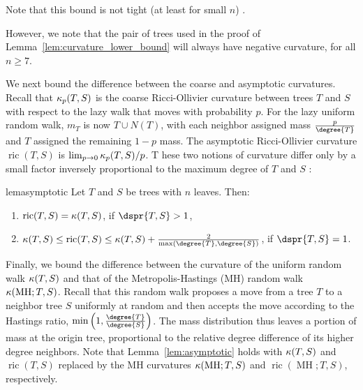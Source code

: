 \documentclass[10pt,twoside,leqno,twocolumn]{article}
\newcommand{\MH}{\operatorname{MH}}
\newcommand{\cuttable}[2][]{%
    \ifthenelse{\equal{#1}{}}%
		{}%
		{#1}%
}
\newcommand{\curvature}[2][]{%
    \ifthenelse{\equal{#1}{}}%
		{\kappa(#2)}%
		{\kappa_{#1}(#2)}%
}
\newcommand{\ric}[1]{
	\operatorname{ric}(#1)%
}
\begin{document}
Note that this bound is not tight (at least for small $n$)\cuttable{ as it is rarely necessary to transport mass the maximum distance between unpaired trees}.
\cuttable{We also note that the lower bounds in this section do not follow from the more general setting described in \cite{Jost2013-ce}.}
However, we note that the pair of trees used in the proof of Lemma~\ref{lem:curvature_lower_bound} will always have negative curvature, for all $n \ge 7$.

We next bound the difference between the coarse and asymptotic curvatures.
Recall that $\curvature[p]{T,S}$ is the coarse Ricci-Ollivier curvature between trees $T$ and $S$ with respect to the lazy walk that \cuttable{remains at a given tree with probability $1-p$ and }moves with probability $p$.
For the lazy uniform random walk, $m_T$ is now $T \cup N(T)$, with each neighbor assigned mass $\frac{p}{\degree{T}}$ and $T$ assigned the remaining $1 - p$ mass.
The asymptotic Ricci-Ollivier curvature $\ric{T,S}$ is $\lim_{p \rightarrow 0} \curvature[p]{T,S} / p$.
\cuttable[T]{As we now prove, t}hese two notions of curvature differ only by a small factor inversely proportional to the maximum degree of $T$ and $S$\cuttable[:]{.}

\begin{restatable}{lem}{asymptotic}
\label{lem:asymptotic}
	Let $T$ and $S$ be trees with $n$ leaves.
	Then:
	\begin{enumerate}
		\item	$\ric{T,S} = \curvature{T,S}$, if $\dspr{T,S} > 1$,
		\item	$\curvature{T,S} \le \ric{T,S} \le \curvature{T,S} + \frac{2}{\max(\degree{T}, \degree{S})}$, if $\dspr{T,S} = 1$.
	\end{enumerate}
\end{restatable}


Finally, we bound the difference between the curvature of the uniform random walk $\curvature{T,S}$ and that of the Metropolis-Hastings (MH) random walk $\curvature{\MH; T,S}$.
Recall that this random walk proposes a move from a tree $T$ to a neighbor tree $S$ uniformly at random and then accepts the move according to the Hastings ratio, \cuttable{which in this case is }$\min\left(1, \frac{\degree{T}}{\degree{S}}\right)$.
The mass distribution \cuttable{for the MH random walk }thus leaves a portion of mass at the origin tree, proportional to the relative degree difference of its higher degree neighbors.
Note that \cuttable{the same statement and proof of }Lemma~\ref{lem:asymptotic} holds with $\curvature{T,S}$ and $\ric{T,S}$ replaced by the MH curvatures $\curvature{\MH; T,S}$ and $\ric{\MH; T,S}$, respectively.
\end{document}
